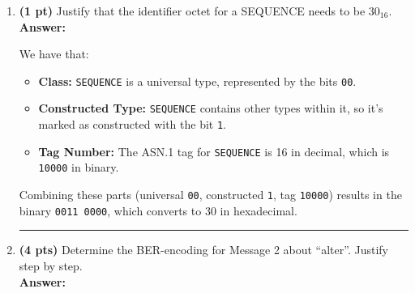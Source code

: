 \documentclass[a4paper,10pt]{article}
\begin{document}
\begin{enumerate}[label=\textbf{Question \arabic*.}]
    \item \textbf{(1 pt)} Justify that the identifier octet for a SEQUENCE needs to be $30_{16}$. \\
    
    \textbf{Answer:}

    We have that:
    \begin{itemize}[left=0pt]
        \item \textbf{Class:} \texttt{SEQUENCE} is a universal type, represented by the bits \texttt{00}.
        \item \textbf{Constructed Type:} \texttt{SEQUENCE} contains other types within it, so it’s marked as constructed with the bit \texttt{1}.
        \item \textbf{Tag Number:} The ASN.1 tag for \texttt{SEQUENCE} is 16 in decimal, which is \texttt{10000} in binary.
    \end{itemize}
    
    Combining these parts (universal \texttt{00}, constructed \texttt{1}, tag \texttt{10000}) results in the binary \texttt{0011\ 0000}, which converts to 30 in hexadecimal.
    
    \noindent\rule{\textwidth}{0.4mm}

    \item \textbf{(4 pts)} Determine the BER-encoding for Message 2 about “alter”. Justify step by step.\\

    \textbf{Answer:}


\end{enumerate}
\end{document}
